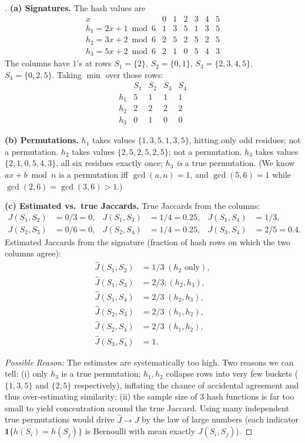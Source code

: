 \documentclass[en,hazy,blue,12pt,normal]{../../elegantnote}
\begin{document}
\begin{proof}[\solutionname]

\textbf{(a) Signatures.} The hash values are
\[
\begin{array}{c|cccccc}
x & 0 & 1 & 2 & 3 & 4 & 5\\\hline
h_1=2x+1\bmod 6 & 1 & 3 & 5 & 1 & 3 & 5\\
h_2=3x+2\bmod 6 & 2 & 5 & 2 & 5 & 2 & 5\\
h_3=5x+2\bmod 6 & 2 & 1 & 0 & 5 & 4 & 3
\end{array}
\]
The columns have $1$'s at rows
$S_1{=}\{2\}$, $S_2{=}\{0,1\}$, $S_3{=}\{2,3,4,5\}$, $S_4{=}\{0,2,5\}$. Taking $\min$ over those rows:
\[
\begin{array}{c|cccc}
 & S_1 & S_2 & S_3 & S_4\\\hline
h_1 & 5 & 1 & 1 & 1\\
h_2 & 2 & 2 & 2 & 2\\
h_3 & 0 & 1 & 0 & 0
\end{array}
\]

\textbf{(b) Permutations.}
$h_1$ takes values $\{1,3,5,1,3,5\}$, hitting only odd residues; not a permutation. $h_2$ takes values $\{2,5,2,5,2,5\}$; not a permutation. $h_3$ takes values $\{2,1,0,5,4,3\}$, all six residues exactly once; $h_3$ \emph{is} a true permutation. (We know $ax+b\bmod n$ is a permutation iff $\gcd(a,n)=1$, and $\gcd(5,6)=1$ while $\gcd(2,6)=\gcd(3,6)>1$.)

\textbf{(c) Estimated vs.\ true Jaccards.}
True Jaccards from the columns:
\[
\begin{aligned}
J(S_1,S_2)&=0/3=0, & J(S_1,S_3)&=1/4=0.25, & J(S_1,S_4)&=1/3,\\
J(S_2,S_3)&=0/6=0, & J(S_2,S_4)&=1/4=0.25, & J(S_3,S_4)&=2/5=0.4.
\end{aligned}
\]
Estimated Jaccards from the signature (fraction of hash rows on which the two columns agree):
\[
\begin{aligned}
\hat J(S_1,S_2)&=1/3\;(h_2 \text{ only}),\\
\hat J(S_1,S_3)&=2/3;(h_2,h_3),\\
\hat J(S_1,S_4)&=2/3\;(h_2,h_3),\\
\hat J(S_2,S_3)&=2/3\;(h_1,h_2),\\
\hat J(S_2,S_4)&=2/3\;(h_1,h_2),\\
\hat J(S_3,S_4)&=1.
\end{aligned}
\]

\emph{Possible Reason:} The estimates are systematically too high. Two reasons we can tell: (i) only $h_3$ is a true permutation; $h_1,h_2$ collapse rows into very few buckets ($\{1,3,5\}$ and $\{2,5\}$ respectively), inflating the chance of accidental agreement and thus over-estimating similarity; (ii) the sample size of $3$ hash functions is far too small to yield concentration around the true Jaccard. Using many independent true permutations would drive $\hat J\to J$ by the law of large numbers (each indicator $\bm 1\{h(S_i)=h(S_j)\}$ is Bernoulli with mean exactly $J(S_i,S_j)$).
\end{proof}
\end{document}
